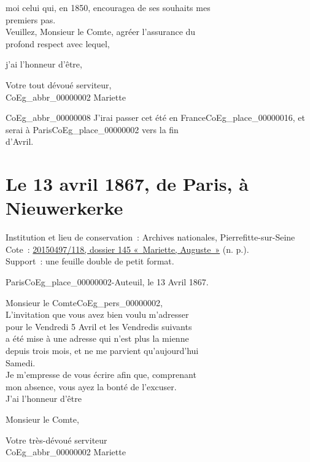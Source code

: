 \documentclass{book}
\begin{document}
{moi celui qui, en 1850, encouragea de ses souhaits mes\\
premiers pas.\\
\indent Veuillez, Monsieur le Comte, agréer l’assurance du\\
profond respect avec lequel,\\
\begin{center} j’ai l’honneur d’être,\end{center}
\begin{center}\hspace{5cm} Votre tout dévoué serviteur,\\
\hspace{5cm} \gls{CoEg_abbr_00000002} Mariette\end{center}
\gls{CoEg_abbr_00000008} J’irai passer cet été en France\gls{CoEg_place_00000016}, et serai à Paris\gls{CoEg_place_00000002} vers la fin\\
d’Avril.

\hypertarget{CoEg_Mariette_1867-04-13}{}
\section*{Le 13 avril 1867, de Paris, à Nieuwerkerke}  
{\footnotesize
\noindent Institution et lieu de conservation~: Archives nationales, Pierrefitte-sur-Seine\\
Cote~: \hyperlink{CoEg_Mariette_ms_001}{20150497/118, dossier 145 «~Mariette, Auguste~»} (n. p.).\\
Support~: une feuille double de petit format.}

\begin{flushright}Paris\gls{CoEg_place_00000002}-Auteuil, le 13 Avril 1867.\end{flushright}

\hspace{1cm} Monsieur le Comte\gls{CoEg_pers_00000002},\\

\indent L’invitation que vous avez bien voulu m’adresser\\
pour le Vendredi 5 Avril et les Vendredis suivants\\
a été mise à une adresse qui n’est plus la mienne\\
depuis trois mois, et ne me parvient qu’aujourd’hui\\
Samedi.\\
\indent Je m’empresse de vous écrire afin que, comprenant\\
mon absence, vous ayez la bonté de l’excuser.\\
\indent J’ai l’honneur d’être\\
\begin{center} Monsieur le Comte,\end{center}
\begin{center}\hspace{5cm} Votre très-dévoué serviteur\\
\hspace{5cm} \gls{CoEg_abbr_00000002} Mariette\end{center}

}
\end{document}
